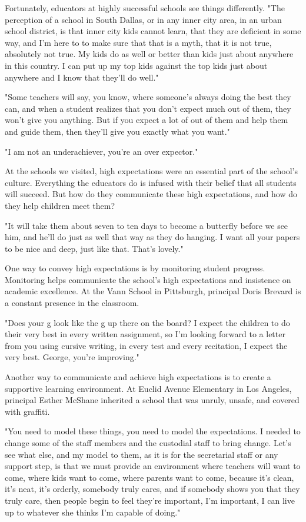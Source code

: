 Fortunately, educators at highly successful schools see things differently.
"The perception of a school in South Dallas, or in any inner city area, in an urban school district, is that inner city kids cannot learn, that they are deficient in some way, and I'm here to to make sure that that is a myth, that it is not true, absolutely not true.
My kids do as well or better than kids just about anywhere in this country.
I can put up my top kids against the top kids just about anywhere and I know that they'll do well."

"Some teachers will say, you know, where someone's always doing the best they can, and when a student realizes that you don't expect much out of them, they won't give you anything.
But if you expect a lot of out of them and help them and guide them, then they'll give you exactly what you want."

"I am not an underachiever, you're an over expector."

At the schools we visited, high expectations were an essential part of the school's culture.
Everything the educators do is infused with their belief that all students will succeed.
But how do they communicate these high expectations, and how do they help children meet them?

"It will take them about seven to ten days to become a butterfly before we see him, and he'll do just as well that way as they do hanging.
I want all your papers to be nice and deep, just like that.
That's lovely."

One way to convey high expectations is by monitoring student progress.
Monitoring helps communicate the school's high expectations and insistence on academic excellence.
At the Vann School in Pittsburgh, principal Doris Brevard is a constant presence in the classroom.

"Does your g look like the g up there on the board?
I expect the children to do their very best in every written assignment, so I'm looking forward to a letter from you using cursive writing, in every test and every recitation, I expect the very best.
George, you're improving."

Another way to communicate and achieve high expectations is to create a supportive learning environment.
At Euclid Avenue Elementary in Los Angeles, principal Esther McShane inherited a school that was unruly, unsafe, and covered with graffiti.

"You need to model these things, you need to model the expectations.
I needed to change some of the staff members and the custodial staff to bring change.
Let's see what else, and my model to them, as it is for the secretarial staff or any support step, is that we must provide an environment where teachers will want to come, where kids want to come, where parents want to come, because it's clean, it's neat, it's orderly, somebody truly cares, and if somebody shows you that they truly care, then people begin to feel they're important, I'm important, I can live up to whatever she thinks I'm capable of doing."

